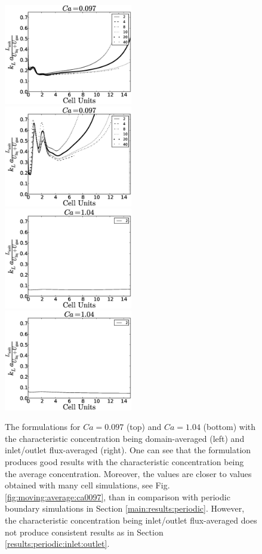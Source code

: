 \documentclass{article}
\begin{document}
\begin{figure}
\includegraphics[width=0.5\textwidth]{Figures/vanbaten_aver_scale_ca097.eps}
\includegraphics[width=0.5\textwidth]{Figures/vanbaten_full_scale_ca097.eps}\\
\includegraphics[width=0.5\textwidth]{Figures/vanbaten_aver_scale_ca14.eps}
\includegraphics[width=0.5\textwidth]{Figures/vanbaten_full_scale_ca14.eps}\\
\caption{The \citet{vanbaten-circular} formulations for $Ca=0.097$ (top) and
$Ca=1.04$ (bottom) with the characteristic concentration being domain-averaged (left)
 and inlet/outlet flux-averaged (right). One can
see that the \citet{vanbaten-circular} formulation produces good results with the characteristic concentration being
the average concentration. Moreover, the values are closer to values obtained with many cell
simulations, see Fig. \ref{fig:moving:average:ca0097}, than in comparison with periodic boundary
simulations in Section \ref{main:results:periodic}. However, the characteristic concentration
being inlet/outlet flux-averaged does not produce consistent results as in Section
\ref{results:periodic:inlet:outlet}.
\label{fig:vanbaten}}
\end{figure}
\end{document}
